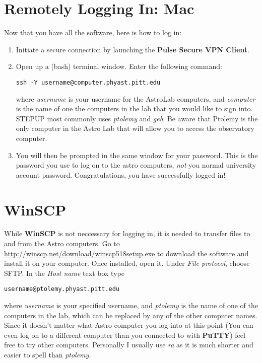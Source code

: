 \documentclass[11pt]{article}
\begin{document}
\section{Remotely Logging In: Mac}
Now that you have all the software, here is how to log in:
\begin{enumerate}
\item Initiate a secure connection by launching the \textbf{Pulse Secure VPN Client}.

\item Open up a (bash) terminal window. Enter the following command:

\begin{verbatim}
ssh -Y username@computer.phyast.pitt.edu
\end{verbatim}

where \emph{username} is your username for the AstroLab computers, and \emph{computer} is the name of one the computers in the lab that you would like to sign into. STEPUP most commonly uses \emph{ptolemy} and \emph{geb}. Be aware that Ptolemy is the only computer in the Astro Lab that will allow you to access the observatory computer.

\item You will then be prompted in the same window for your password. This is the password you use to log on to the astro computers, \emph{not} you normal university account password. Congratulations, you have successfully logged in!
\end{enumerate}

\section{WinSCP}
While \textbf{WinSCP} is not neccessary for logging in, it is needed to transfer files to and from the Astro computers. Go to \url{http://winscp.net/download/winscp518setup.exe} to download the software and install it on your computer. Once installed, open it. Under \emph{File protocol}, choose SFTP. In the \emph{Host name} text box type

\begin{verbatim}
username@ptolemy.phyast.pitt.edu
\end{verbatim}
where \emph{username} is your specified username, and \emph{ptolemy} is the name of one of the computers in the lab, which can be replaced by any of the other computer names. Since it doesn't matter what Astro computer you log into at this point (You can even log on to a different computer than you connected to with \textbf{PuTTY}) feel free to try other computers. Personally I usually use \emph{ra} as it is much shorter and easier to spell than \emph{ptolemy}.
\end{document}
